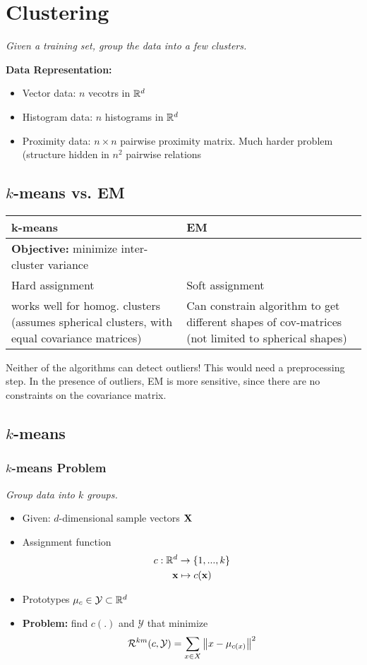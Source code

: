 \section{Clustering}
\textit{Given a training set, group the data into a few clusters. }

\textbf{Data Representation:}
\begin{itemize}
	\item Vector data: $n$ vecotrs in $\mathbb R^d$
	\item Histogram data:  $n$ histograms in $\mathbb R^d$
	\item Proximity data:  $n \times n$ pairwise proximity matrix. Much harder problem (structure hidden in $n^2$ pairwise relations

\end{itemize}
\subsection{$k$-means vs. EM}
\begin{tabular}{ p{} | p{} }
		\textbf{k-means} & \textbf{EM}\\\hline
		 \textbf{Objective: } minimize inter-cluster variance & \\\hline
		 Hard assignment & Soft assignment \\\hline	
  		works well for homog. clusters (assumes spherical clusters, with equal covariance matrices) & Can constrain algorithm to get different shapes of cov-matrices (not limited to spherical shapes)\\\hline
\end{tabular}

Neither of the algorithms can detect outliers! This would need a preprocessing step. In the presence of outliers, EM is more sensitive, since there are no constraints on the covariance matrix.

\subsection{$k$-means}
\subsubsection{$k$-means Problem}
\textit{Group data into $k$ groups.}

\begin{itemize}
	\item Given: $d$-dimensional sample vectors $\mathbf X$
	\item Assignment function
	\begin{equation*}
		\begin{gathered}
			c: \mathbb R^d \to \{1, ..., k\} \\
			\mathbf x \mapsto c(\mathbf x)
		\end{gathered}
	\end{equation*}
	\item Prototypes $\mu_c \in \mathcal Y \subset \mathbb R^d$
	\item \textbf{Problem: } find $c(.)$ and $\mathcal Y$ that minimize
	$$
		\mathcal R^{km}(c,\mathcal Y) = \sum_{x\in X}\left\lVert x - \mu_{c(x)}\right\rVert^2
	$$
\end{itemize}

